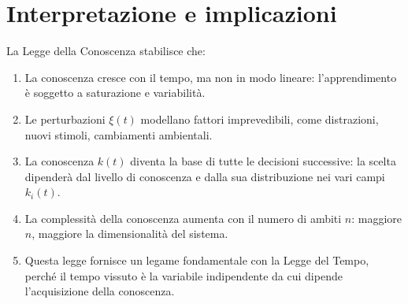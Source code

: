 \documentclass[12pt,a4paper]{article}
\begin{document}
\begin{center}
\end{center}

\caption*{La curva blu rappresenta l’evoluzione concettuale della conoscenza nel tempo, soggetta a perturbazioni $\xi(t)$. La linea rossa tratteggiata indica il limite massimo teorico $k_{\max}$.}

\section{Interpretazione e implicazioni}

La Legge della Conoscenza stabilisce che:

\begin{enumerate}
    \item La conoscenza cresce con il tempo, ma non in modo lineare: l’apprendimento è soggetto a saturazione e variabilità.
    \item Le perturbazioni $\xi(t)$ modellano fattori imprevedibili, come distrazioni, nuovi stimoli, cambiamenti ambientali.
    \item La conoscenza $k(t)$ diventa la base di tutte le decisioni successive: la scelta dipenderà dal livello di conoscenza e dalla sua distribuzione nei vari campi $k_i(t)$.
    \item La complessità della conoscenza aumenta con il numero di ambiti $n$: maggiore $n$, maggiore la dimensionalità del sistema.
    \item Questa legge fornisce un legame fondamentale con la Legge del Tempo, perché il tempo vissuto è la variabile indipendente da cui dipende l’acquisizione della conoscenza.
\end{enumerate}
\end{document}
